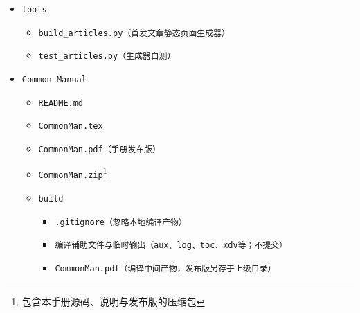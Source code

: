 \documentclass[fontset=fandol]{ctexrep}
\begin{document}
\begin{itemize}
\begin{itemize}
\begin{itemize}
			\begin{itemize}
				\item{\verb|WeChatArticleList1.html（等各期公众号原文列表页）|}
				\item{\verb|WeChatContact.html|}
				\item{\verb|data.js|}
				\item{\verb|wechat-article-01.md（等文章Markdown文件，编号连续）|}
			\end{itemize}
			\item{\verb|LOFTER|}
			\begin{itemize}
				\item{\verb|LofterArticleList1.html（等各期LOFTER原文列表页）|}
				\item{\verb|data.js|}
				\item{\verb|lofter-article-01.md（等文章Markdown文件，编号连续）|}
			\end{itemize}
			\item{\verb|special-sub|}
			\begin{itemize}
				\item{\verb|SpecialArticleList.html|}
				\item{\verb|data.js|}
				\item{\verb|special-article-01.md（等文章Markdown文件，编号连续）|}
			\end{itemize}
		\end{itemize}
		\item{\verb|tools|}
		\begin{itemize}
			\item{\verb|build_articles.py（首发文章静态页面生成器）|}
			\item{\verb|test_articles.py（生成器自测）|}
		\end{itemize}
		\item{\verb|Common Manual|}
		\begin{itemize}
			\item{\verb|README.md|}
			\item{\verb|CommonMan.tex|}
			\item{\verb|CommonMan.pdf（手册发布版）|}
			\item{\verb|CommonMan.zip|\footnote{包含本手册源码、说明与发布版的压缩包}}
			\item{\verb|build|}
			\begin{itemize}
				\item{\verb|.gitignore（忽略本地编译产物）|}
				\item{\verb|编译辅助文件与临时输出（aux、log、toc、xdv等；不提交）|}
				\item{\verb|CommonMan.pdf（编译中间产物，发布版另存于上级目录）|}
			\end{itemize}
		\end{itemize}
	\end{itemize}
\end{itemize}
\end{document}
